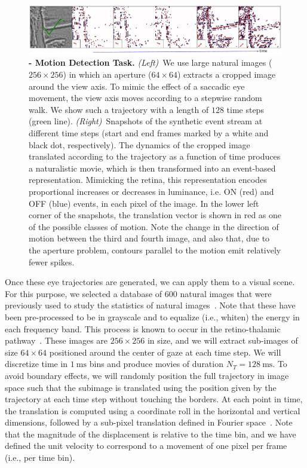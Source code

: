 \documentclass[default]{sn-jnl}%
\theoremstyle{thmstyleone}%
\theoremstyle{thmstyletwo}%
\theoremstyle{thmstylethree}%
\newcommand{\ms}{\si{\milli\second}}%
\begin{document}
\begin{figure}%
    \centering
    \includegraphics[width=0.95\linewidth]{figures/motion_task.pdf}
    \caption{
        {\bf - Motion Detection Task.} \textit{(Left)}~We use large natural images ($256\times256$) in which an aperture ($64\times64$) extracts a cropped image around the view axis. To mimic the effect of a saccadic eye movement, the view axis moves according to a stepwise random walk. We show such a trajectory with a length of $128$ time steps (green line). \textit{(Right)}~Snapshots of the synthetic event stream at different time steps (start and end frames marked by a white and black dot, respectively). The dynamics of the cropped image translated according to the trajectory as a function of time produces a naturalistic movie, which is then transformed into an event-based representation. Mimicking the retina, this representation encodes proportional increases or decreases in luminance, i.e. ON (red) and OFF (blue) events, in each pixel of the image. In the lower left corner of the snapshots, the translation vector is shown in red as one of the possible classes of motion. Note the change in the direction of motion between the third and fourth image, and also that, due to the aperture problem, contours parallel to the motion emit relatively fewer spikes.}
    \label{fig:motion_task}
\end{figure}
Once these eye trajectories are generated, we can apply them to a visual scene.  
For this purpose, we selected a database of $600$ natural images that were previously used to study the statistics of natural images~\citep{perrinet_edge_2015}. Note that these have been pre-processed to be in grayscale and to equalize (i.e., whiten) the energy in each frequency band. This process is known to occur in the retino-thalamic pathway~\citep{dan_efficient_1996}. These images are $256 \times 256$ in size, and we will extract sub-images of size $64 \times 64$ positioned around the center of gaze at each time step. We will discretize time in $1~\ms$ bins and produce movies of duration $N_T = 128~\ms$. To avoid boundary effects, we will randomly position the full trajectory in image space such that the subimage is translated using the position given by the trajectory at each time step without touching the borders. At each point in time, the translation is computed using a coordinate roll in the horizontal and vertical dimensions, followed by a sub-pixel translation defined in Fourier space~\citep{perrinet_sparse_2015}. Note that the magnitude of the displacement is relative to the time bin, and we have defined the unit velocity to correspond to a movement of one pixel per frame (i.e., per time bin).
\end{document}
